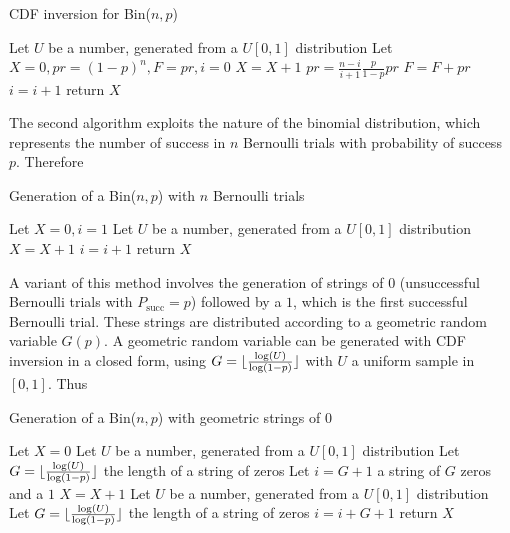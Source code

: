 \documentclass[10pt]{article}
\DeclarePairedDelimiter{\floor}{\lfloor}{\rfloor}
\begin{document}
\begin{algorithm}
  \caption{CDF inversion for Bin($n, p$)}\label{cdfinvbin}
  \begin{algorithmic}[1]
    \Procedure{}{}
    \State Let $U$ be a number, generated from a $U[0,1]$ distribution
    \State Let $X = 0, pr = (1-p)^n, F = pr, i = 0$
    \State $X = X + 1$
    \State $pr = \frac{n-i}{i+1} \frac{p}{1-p} pr$
    \State $F = F + pr$
    \State $i = i + 1$
    \EndWhile
    \State return $X$
    \EndProcedure
  \end{algorithmic}
\end{algorithm}

The second algorithm exploits the nature of the binomial distribution, which represents the number of success in $n$ Bernoulli trials with probability of success $p$. Therefore

\begin{algorithm}
  \caption{Generation of a Bin($n, p$) with $n$ Bernoulli trials}\label{ber}
  \begin{algorithmic}[1]
    \Procedure{}{}
    \State Let $X = 0, i = 1$
    \State Let $U$ be a number, generated from a $U[0,1]$ distribution
    \State $X = X + 1$
    \EndIf
    \State $i = i + 1$
    \EndWhile
    \State return $X$
    \EndProcedure
  \end{algorithmic}
\end{algorithm}

A variant of this method involves the generation of strings of $0$ (unsuccessful Bernoulli trials with $P_{\text{succ}} = p$) followed by a $1$, which is the first successful Bernoulli trial. These strings are distributed according to a geometric random variable $G(p)$. A geometric random variable can be generated with CDF inversion in a closed form, using $G = \floor{\frac{\log(U)}{\log(1-p)}}$ with $U$ a uniform sample in $[0,1]$. Thus
\begin{algorithm}
  \caption{Generation of a Bin($n, p$) with geometric strings of $0$}\label{geo}
  \begin{algorithmic}[1]
    \Procedure{}{}
    \State Let $X = 0$
    \State Let $U$ be a number, generated from a $U[0,1]$ distribution
    \State Let $G = \floor{\frac{\log(U)}{\log(1-p)}}$ the length of a string of zeros
    \State Let $i = G + 1$ a string of $G$ zeros and a $1$
    \State $X = X + 1$
    \State Let $U$ be a number, generated from a $U[0,1]$ distribution
    \State Let $G = \floor{\frac{\log(U)}{\log(1-p)}}$ the length of a string of zeros
    \State $i = i +G+ 1$
    \EndWhile
    \State return $X$
    \EndProcedure
  \end{algorithmic}
\end{algorithm}
\end{document}
